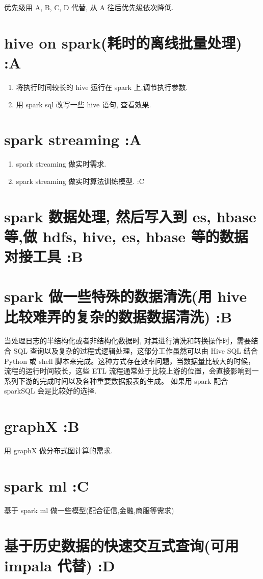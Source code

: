 \documentclass[11pt]{article}
\author{kay}
\date{\today}
\title{}
\begin{document}
\tableofcontents

优先级用 A, B, C, D 代替, 从 A 往后优先级依次降低.
\section{hive on spark(耗时的离线批量处理) :A}
\label{sec:orgda377f0}
\begin{enumerate}
\item 将执行时间较长的 hive 运行在 spark 上,调节执行参数.
\item 用 spark sql 改写一些 hive 语句, 查看效果.
\end{enumerate}
\section{spark streaming :A}
\label{sec:orgfa1c121}
\begin{enumerate}
\item spark streaming 做实时需求.
\item spark streaming 做实时算法训练模型. :C
\end{enumerate}
\section{spark 数据处理, 然后写入到 es, hbase 等,做 hdfs, hive, es, hbase 等的数据对接工具 :B}
\label{sec:orgb852ac9}
\section{spark 做一些特殊的数据清洗(用 hive 比较难弄的复杂的数据数据清洗) :B}
\label{sec:org863264d}
当处理日志的半结构化或者非结构化数据时, 对其进行清洗和转换操作时，需要结合 SQL 查询以及复杂的过程式逻辑处理，这部分工作虽然可以由 Hive SQL 结合 Python 或 shell 脚本来完成。这种方式存在效率问题，当数据量比较大的时候，流程的运行时间较长，这些 ETL 流程通常处于比较上游的位置，会直接影响到一系列下游的完成时间以及各种重要数据报表的生成。
如果用 spark 配合 sparkSQL 会是比较好的选择.
\section{graphX :B}
\label{sec:org028f923}
用 graphX 做分布式图计算的需求.
\section{spark ml :C}
\label{sec:orgcda051b}
基于 spark ml 做一些模型(配合征信,金融,商服等需求)
\section{基于历史数据的快速交互式查询(可用 impala 代替) :D}
\label{sec:org652b9fd}
\end{document}
